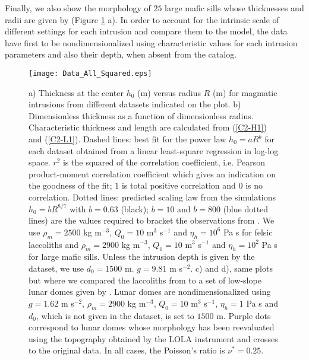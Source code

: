 Finally, we also  show the morphology of $25$ large  mafic sills whose
thicknesses  and   radii  are   given  by   \citet{Cruden:tg}  (Figure
\ref{C2-Corry_Rocchie}  a).  In  order  to account  for the  intrinsic
scale of different settings for each intrusion and compare them to the
model,   the  data   have   first  to   be  nondimensionalized   using
characteristic  values for  each intrusion  parameters and  also their
depth, when absent from the catalog.

\begin{figure}[htpb]
  \begin{center}
    \graphicspath{ {/Users/thorey/Documents/These/Projet/Refroidissement/Skin_Model/Figure/Figure_Data/} }
    \texttt{[image: Data\_All\_Squared.eps]}
    \caption{a) Thickness  at the center  $h_0$ (m) versus  radius $R$
      (m) for magmatic intrusions from different datasets indicated on
      the  plot.    b)  Dimensionless  thickness  as   a  function  of
      dimensionless  radius. Characteristic  thickness and  length are
      calculated from (\ref{C2-H1})  and (\ref{C2-L1}).  Dashed lines:
      best fit for the power  law $h_0=aR^b$ for each dataset obtained
      from a linear least-square regression in log-log space. $r^2$ is
      the  squared  of  the  correlation  coefficient,  i.e.   Pearson
      product-moment correlation coefficient which gives an indication
      on the  goodness of the  fit; $1$ is total  positive correlation
      and $0$ is  no correlation. Dotted lines:  predicted scaling law
      from  the  simulations  $h_0=bR^{8/7}$  with  $b=0.63$  (black);
      $b=10$ and $b=800$  (blue dotted lines) are  the values required
      to  bracket  the  observations from  \citet{E:2015tl}.   We  use
      $\rho_m=2500$  kg   m$^{-3}$,  $Q_0  =10$  m$^3$   s$^{-1}$  and
      $\eta_h=10^6$ Pa  s for  felsic laccoliths and  $\rho_m=2900$ kg
      m$^{-3}$, $Q_0  =10$ m$^3$ s$^{-1}$  and $\eta_h=10^2$ Pa  s for
      large mafic sills.   Unless the intrusion depth is  given by the
      dataset, we use $d_0=1500$ m.   $g=9.81$ m s$^{-2}$.  c) and d),
      same   plots  but   where  we   compared  the   laccoliths  from
      \citet{Rocchi:2002jy} to a set of low-slope lunar domes given by
      \citet{Wohler:2009jj}.  Lunar domes are nondimensionalized using
      $g=1.62$ m s$^{-2}$, $\rho_m=2900$  kg m$^{-3}$, $Q_0 =10$ m$^3$
      s$^{-1}$, $\eta_h=1$ Pa  s and $d_0$, which is not  given in the
      dataset, is  set to $1500$  m.  Purple dots correspond  to lunar
      domes whose morphology has been reevaluated using the topography
      obtained  by the  LOLA instrument  and crosses  to the  original
      data.  In all cases, the Poisson's ratio is $\nu^*=0.25$.}
    \label{C2-Corry_Rocchie}
  \end{center}
\end{figure}

